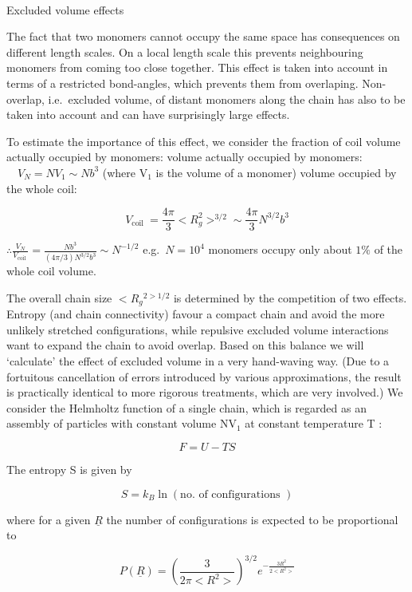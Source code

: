 \documentclass[
  letterpaper,
  DIV=11,
  numbers=noendperiod]{scrartcl}
\makeatletter
\let\oldparagraph\paragraph
\renewcommand{\paragraph}{
    \@ifstar
      \xxxParagraphStar
      \xxxParagraphNoStar
  }
\newcommand{\xxxParagraphStar}[1]{\oldparagraph*{#1}\mbox{}}
\newcommand{\xxxParagraphNoStar}[1]{\oldparagraph{#1}\mbox{}}
\makeatother
\begin{document}
\paragraph{Excluded volume effects}\label{excluded-volume-effects}

The fact that two monomers cannot occupy the same space has consequences
on different length scales. On a local length scale this prevents
neighbouring monomers from coming too close together. This effect is
taken into account in terms of a restricted bond-angles, which prevents
them from overlaping. Non-overlap, i.e.~excluded volume, of distant
monomers along the chain has also to be taken into account and can have
surprisingly large effects.

To estimate the importance of this effect, we consider the fraction of
coil volume actually occupied by monomers: volume actually occupied by
monomers: \(\quad V_{N}=N V_{1} \sim N b^{3}\) (where \(\mathrm{V}_{1}\)
is the volume of a monomer) volume occupied by the whole coil:

\[
V_{\text {coil }}=\frac{4 \pi}{3}<R_{g}^{2}>^{3 / 2} \sim \frac{4 \pi}{3} N^{3 / 2} b^{3}
\]

\(\therefore \frac{V_{N}}{V_{\text {coil }}}=\frac{N b^{3}}{(4 \pi / 3) N^{3 / 2} b^{3}} \sim N^{-1 / 2}\)
e.g.~\(N=10^{4}\) monomers occupy only about \(1 \%\) of the whole coil
volume.

The overall chain size \(<R_{g}{ }^{2>1 / 2}\) is determined by the
competition of two effects. Entropy (and chain connectivity) favour a
compact chain and avoid the more unlikely stretched configurations,
while repulsive excluded volume interactions want to expand the chain to
avoid overlap. Based on this balance we will `calculate' the effect of
excluded volume in a very hand-waving way. (Due to a fortuitous
cancellation of errors introduced by various approximations, the result
is practically identical to more rigorous treatments, which are very
involved.) We consider the Helmholtz function of a single chain, which
is regarded as an assembly of particles with constant volume
\(\mathrm{NV}_{1}\) at constant temperature T :

\[
F=U-T S
\]

The entropy S is given by

\[
S=k_{B} \ln (\mathrm{no} \text {. of configurations })
\]

where for a given \(\underline{R}\) the number of configurations is
expected to be proportional to

\[
P(\underline{R})=\left(\frac{3}{2 \pi<R^{2}>}\right)^{3 / 2} e^{-\frac{3 R^{2}}{2<R^{2}>}}
\]
\end{document}

